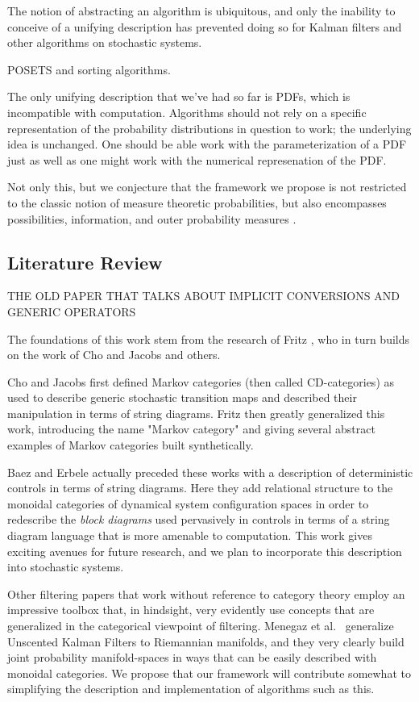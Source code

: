 \documentclass[letterpaper, 10 pt, conference]{ieeeconf}  %
\begin{document}
The notion of abstracting an algorithm is ubiquitous, and only the inability to conceive of a unifying description has prevented doing so for Kalman filters and other algorithms on stochastic systems. 

POSETS and sorting algorithms.

The only unifying description that we've had so far is PDFs, which is incompatible with computation. Algorithms should not rely on a specific representation of the probability distributions in question to work; the underlying idea is unchanged. One should be able work with the parameterization of a PDF just as well as one might work with the numerical represenation of the PDF.

Not only this, but we conjecture that the framework we propose is not restricted to the classic notion of measure theoretic probabilities, but also encompasses possibilities, information, and outer probability measures \cite{delande}. 

\subsection{Literature Review}

THE OLD PAPER THAT TALKS ABOUT IMPLICIT CONVERSIONS AND GENERIC OPERATORS

The foundations of this work stem from the research of Fritz \cite{fritz}, who in turn builds on the work of Cho and Jacobs \cite{cho} and others.

Cho and Jacobs first defined Markov categories (then called CD-categories) as used to describe generic stochastic transition maps and described their manipulation in terms of string diagrams. Fritz then greatly generalized this work, introducing the name "Markov category" and giving several abstract examples of Markov categories built synthetically. 

Baez and Erbele \cite{baez} actually preceded these works with a description of deterministic controls in terms of string diagrams. Here they add relational structure to the monoidal categories of dynamical system configuration spaces in order to redescribe the \emph{block diagrams} used pervasively in controls in terms of a string diagram language that is more amenable to computation.
This work gives exciting avenues for future research, and we plan to incorporate this description into stochastic systems.

Other filtering papers that work without reference to category theory employ an impressive toolbox that, in hindsight, very evidently use concepts that are generalized in the categorical viewpoint of filtering.
Menegaz et al.\ \cite{menegaz} generalize Unscented Kalman Filters to Riemannian manifolds, and they very clearly build joint probability manifold-spaces in ways that can be easily described with monoidal categories.
We propose that our framework will contribute somewhat to simplifying the description and implementation of algorithms such as this.
\end{document}
